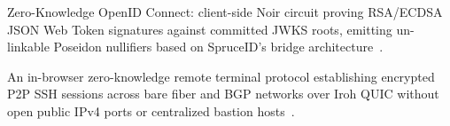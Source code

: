 \documentclass[a4paper,11pt,twoside,parskip=half-,headings=small]{scrartcl}
\begin{document}
\begin{description}[style=nextline,leftmargin=1.5em]
  \item[\hypertarget{glossary:zkoidc}{\textbf{zkOIDC}} (\cref{sec:zkoidc})] Zero-Knowledge OpenID Connect: client-side Noir circuit proving RSA/ECDSA JSON Web Token signatures against committed JWKS roots, emitting un-linkable Poseidon nullifiers based on SpruceID's bridge architecture~\cite{spruceid2022siwe,aztec2021noir}.
  \item[\hypertarget{glossary:zkssh}{\textbf{zkSSH / zkTerminal}} (\cref{sec:sovereign_ssh})] An in-browser zero-knowledge remote terminal protocol establishing encrypted P2P SSH sessions across bare fiber and BGP networks over Iroh QUIC without open public IPv4 ports or centralized bastion hosts~\cite{iroh2024}.
\end{description}
\end{document}
